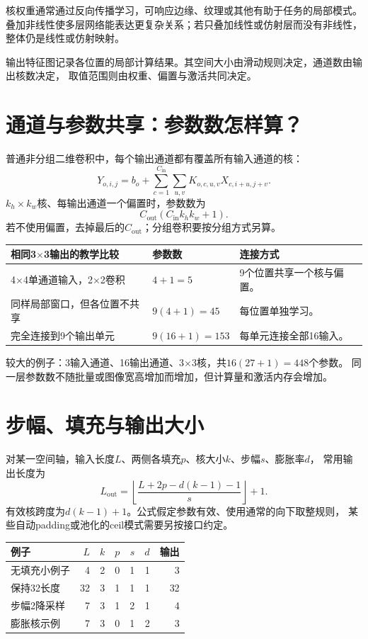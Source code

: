 核权重通常通过反向传播学习，可响应边缘、纹理或其他有助于任务的局部模式。
叠加非线性使多层网络能表达更复杂关系；若只叠加线性或仿射层而没有非线性，
整体仍是线性或仿射映射。

输出特征图记录各位置的局部计算结果。其空间大小由滑动规则决定，通道数由输出核数决定，
取值范围则由权重、偏置与激活共同决定。

\section{通道与参数共享：参数数怎样算？}
\label{sec:cnn-parameters}
普通非分组二维卷积中，每个输出通道都有覆盖所有输入通道的核：
\[
 Y_{o,i,j}=b_o+\sum_{c=1}^{C_{\mathrm{in}}}\sum_{u,v}K_{o,c,u,v}X_{c,i+u,j+v}.
\]
$k_h\times k_w$核、每输出通道一个偏置时，参数数为
\[
 C_{\mathrm{out}}(C_{\mathrm{in}}k_hk_w+1).
\]
若不使用偏置，去掉最后的$C_{\mathrm{out}}$；分组卷积要按分组方式另算。

\begin{center}
\begin{tabularx}{\textwidth}{P{52mm}P{28mm}Y}
\toprule
相同3$\times$3输出的教学比较 & 参数数 & 连接方式\\
$\times$4单通道输入，2$\times$2卷积 & $4+1=5$ & 9个位置共享一个核与偏置。\\
同样局部窗口，但各位置不共享 & $9(4+1)=45$ & 每位置单独学习。\\
完全连接到9个输出单元 & $9(16+1)=153$ & 每单元连接全部16输入。\\
\bottomrule
\end{tabularx}
\end{center}

较大的例子：3输入通道、16输出通道、3$\times$3核，共$16(27+1)=448$个参数。
同一层参数数不随批量或图像宽高增加而增加，但计算量和激活内存会增加。


\section{步幅、填充与输出大小}
\label{sec:cnn-shape}
对某一空间轴，输入长度$L$、两侧各填充$p$、核大小$k$、步幅$s$、膨胀率$d$，
常用输出长度为
\[
 L_{\mathrm{out}}=\left\lfloor\frac{L+2p-d(k-1)-1}{s}\right\rfloor+1.
\]
有效核跨度为$d(k-1)+1$。公式假定参数有效、使用通常的向下取整规则，
某些自动padding或池化的ceil模式需要另按接口约定。

\begin{center}
\begin{tabular}{lrrrrrr}
\toprule
例子 & $L$ & $k$ & $p$ & $s$ & $d$ & 输出\\
\midrule
无填充小例子 & 4 & 2 & 0 & 1 & 1 & 3\\
保持32长度 & 32 & 3 & 1 & 1 & 1 & 32\\
步幅2降采样 & 7 & 3 & 1 & 2 & 1 & 4\\
膨胀核示例 & 7 & 3 & 0 & 1 & 2 & 3\\
\bottomrule
\end{tabular}
\end{center}

